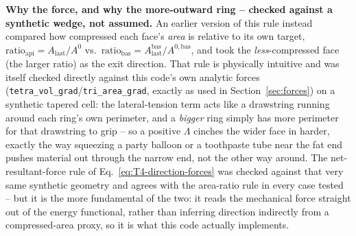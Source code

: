 \documentclass[11pt,a4paper]{report}
\begin{document}
\begin{physbox}
\textbf{Why the force, and why the more-outward ring -- checked
against a synthetic wedge, not assumed.} An earlier version of this
rule instead compared how compressed each face's \emph{area} is
relative to its own target, $\text{ratio}_{\mathrm{api}}=A_{\mathrm{last}}/A^0$
vs.\ $\text{ratio}_{\mathrm{bas}}=A^{\mathrm{bas}}_{\mathrm{last}}/A^{0,\mathrm{bas}}$,
and took the \emph{less}-compressed face (the larger ratio) as the
exit direction. That rule is physically intuitive and was itself
checked directly against this code's own analytic forces
(\texttt{tetra\_vol\_grad}/\texttt{tri\_area\_grad}, exactly as used in
Section~\ref{sec:forces}) on a synthetic tapered cell: the
lateral-tension term acts like a drawstring running around each ring's
own perimeter, and a \emph{bigger} ring simply has more perimeter for
that drawstring to grip -- so a positive $\Lambda$ cinches the wider
face in harder, exactly the way squeezing a party balloon or a
toothpaste tube near the fat end pushes material out through the
narrow end, not the other way around. The net-resultant-force rule of
Eq.~\eqref{eq:T4-direction-forces} was checked against that very same
synthetic geometry and agrees with the area-ratio rule in every case
tested -- but it is the more fundamental of the two: it reads the
mechanical force straight out of the energy functional, rather than
inferring direction indirectly from a compressed-area proxy, so it is
what this code actually implements.


\end{physbox}
\end{document}
